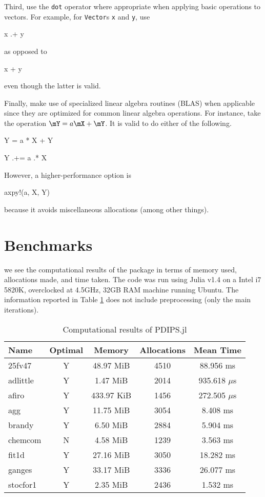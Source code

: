\documentclass[titlepage]{abhi-tufte-handout}
\begin{document}
Third, use the \texttt{dot} operator where appropriate when applying basic
operations to vectors. For example, for \texttt{Vector}s \texttt{x} and
\texttt{y}, use
\begin{dispjulia}
x .+ y
\end{dispjulia}
as opposed to
\begin{dispjulia}
x + y
\end{dispjulia}
even though the latter is valid.

Finally, make use of specialized linear algebra routines (BLAS) when
applicable since they are optimized for common linear algebra operations.
For instance, take the operation \(\mY = a\mX + \mY\). It is valid
to do either of the following.
\begin{dispjulia}
Y = a * X + Y
\end{dispjulia}
\begin{dispjulia}
Y .+= a .* X
\end{dispjulia}
However, a higher-performance option is
\begin{dispjulia}
axpy!(a, X, Y)
\end{dispjulia}
because it avoids miscellaneous allocations (among other things).

\section{Benchmarks}\label{sec:benchmarks}
 we see the computational results of the package
in terms of memory used, allocations made, and time taken. The code was run
using Julia v1.4 on a Intel i7 5820K, overclocked at 4.5GHz, 32GB RAM machine
running Ubuntu. The information reported in Table \ref{tab:results} does not
include preprocessing (only the main iterations).
\begin{table}[ht]
    \centering
    \selectfont
    \begin{tabular}{l c c c c}
        \toprule
        Name & Optimal & Memory & Allocations & Mean Time  \\
        \midrule
        25fv47 & Y & 48.97 MiB & 4510 & 88.956 ms \\
        adlittle & Y & 1.47 MiB & 2014 & 935.618 \(\mu\)s \\
        afiro & Y & 433.97 KiB & 1456 & 272.505 \(\mu\)s \\
        agg & Y & 11.75 MiB & 3054 & 8.408 ms \\
        brandy & Y & 6.50 MiB & 2884 & 5.904 ms \\
        chemcom & N & 4.58 MiB & 1239 & 3.563 ms \\
        fit1d & Y & 27.16 MiB & 3050 & 18.282 ms \\
        ganges & Y & 33.17 MiB & 3336 & 26.077 ms \\
        stocfor1 & Y & 2.35 MiB & 2436 & 1.532 ms \\
        \bottomrule
    \end{tabular}
    \caption{Computational results of PDIPS.jl}
    \label{tab:results}
\end{table}

\newpage


\end{document}
